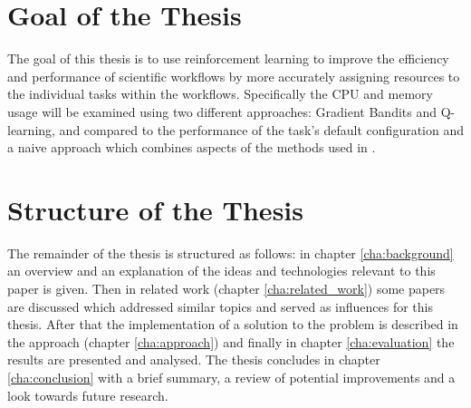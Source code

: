 
\section{Goal of the Thesis}
\label{sec:goal}

The goal of this thesis is to use reinforcement learning to improve the efficiency and performance of scientific workflows by more accurately assigning resources to the individual tasks within the workflows. Specifically the CPU and memory usage will be examined using two different approaches: Gradient Bandits and Q-learning, and compared to the performance of the task's default configuration and a naive approach which combines aspects of the methods used in \cite{tovarjob,FeedbackBasedAllocation}.

\section{Structure of the Thesis}
\label{sec:structure}

The remainder of the thesis is structured as follows: in chapter \ref{cha:background} an overview and an explanation of the ideas and technologies relevant to this paper is given. Then in related work (chapter \ref{cha:related_work}) some papers are discussed which addressed similar topics and served as influences for this thesis. After that the implementation of a solution to the problem is described in the approach (chapter \ref{cha:approach}) and finally in chapter \ref{cha:evaluation} the results are presented and analysed. The thesis concludes in chapter \ref{cha:conclusion} with a brief summary, a review of potential improvements and a look towards future research.